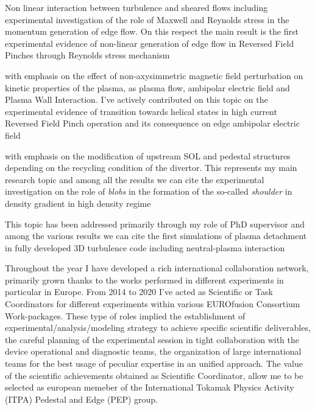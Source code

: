 \begin{description}[labelindent=0.5pt, labelsep*=0.4em, leftmargin=!, itemsep=0.05ex]
\item[(d) Sheared flow generation:] Non linear interaction
between turbulence and sheared flows including experimental
investigation of the role of Maxwell and Reynolds stress in the
momentum generation of edge flow. On this respect the main result is
the first experimental evidence of non-linear generation of edge
  flow in Reversed Field Pinches through Reynolds stress
  mechanism \cite{Vianello:2005p1976,Vianello:2005p2671}
\item[(e) Magnetic topology and its relation with plasma flow:] with
emphasis on the effect of non-axysimmetric magnetic field perturbation on kinetic
properties of the plasma, as plasma flow, ambipolar electric field and
Plasma Wall Interaction. I've actively contributed on this topic on
the experimental evidence of transition towards helical states in
high current Reversed Field Pinch
operation \cite{Lorenzini:2009p4248} and its consequence on edge
ambipolar electric field  \cite{Spizzo:2014jn}
\item[(f) Divertor and SOL physics:] with emphasis on the
  modification of upstream SOL and pedestal structures depending on
  the recycling condition of the divertor. This represents my main
  research topic and among all the results we can cite the experimental investigation on the role of \emph{blobs} in the
  formation of the so-called \emph{shoulder} in density gradient in
  high density regime \cite{Carralero:prl2015, vianello:nf2019, stagni:nf2022, Stagni:nf2024}
\item[(g) 3D self consistent simulation of edge plasma:] This topic
  has been addressed primarily through my role of PhD supervisor and
  among the various results we can cite the first simulations of plasma detachment in fully developed 3D
turbulence code including neutral-plasma interaction \cite{Mancini:nf2023}
\end{description}

Throughout the year I have developed a rich  international collaboration network,
primarily grown  thanks to the works performed in
different experiments in particular in Europe. From 2014 to 2020 I've
acted as Scientific or Task Coordinators for different experiments
within various EUROfusion Consortium Work-packages. These type of
roles implied the establishment of  experimental/analysis/modeling strategy to achieve
specific scientific deliverables,  the careful planning of the
experimental session in tight collaboration with the device
operational and diagnostic teams,  the organization of large
international teams for the best usage of peculiar expertise in an
unified approach. The value of the scientific achievements obtained as
Scientific Coordinator, allow me to be selected as european memeber of
the International Tokamak Physics Activity (ITPA) Pedestal and Edge
(PEP) group.

